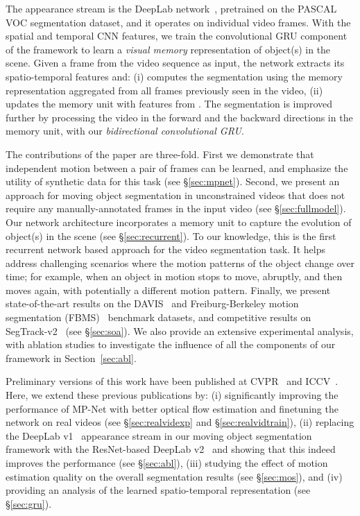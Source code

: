 The appearance stream is the DeepLab
network~\cite{chen2014semantic,CP2016Deeplab}, pretrained on the PASCAL VOC
segmentation dataset, and it operates on individual video frames.  With the
spatial and temporal CNN features, we train the convolutional GRU component of
the framework to learn a {\it visual memory} representation of object(s) in the
scene. Given a frame  from the video sequence as input, the network extracts
its spatio-temporal features and: (i) computes the segmentation using the
memory representation aggregated from all frames previously seen in the video,
(ii) updates the memory unit with features from . The segmentation is
improved further by processing the video in the forward and the backward
directions in the memory unit, with our {\it bidirectional convolutional GRU}.

The contributions of the paper are three-fold. First we demonstrate that
independent motion between a pair of frames can be learned, and emphasize the
utility of synthetic data for this task (see \S\ref{sec:mpnet}). Second, we present an approach for
moving object segmentation in unconstrained videos that does not require any
manually-annotated frames in the input video (see \S\ref{sec:fullmodel}).  Our
network architecture incorporates a memory unit to capture the evolution of
object(s) in the scene (see \S\ref{sec:recurrent}). To our knowledge, this is
the first recurrent network based approach for the video segmentation task. It
helps address challenging scenarios where the motion patterns of the object
change over time; for example, when an object in motion stops to move,
abruptly, and then moves again, with potentially a different motion pattern.
Finally, we present state-of-the-art results on the DAVIS~\cite{Perazzi16} and
Freiburg-Berkeley motion segmentation (FBMS)~\cite{ochs2014segmentation}
benchmark datasets, and competitive results on SegTrack-v2~\cite{li2013video}
(see \S\ref{sec:soa}). We also provide an extensive experimental analysis, with
ablation studies to investigate the influence of all the components of our
framework in Section~\ref{sec:abl}. 

Preliminary versions of this work have been published at
CVPR~\cite{tokmakov2016learning} and ICCV~\cite{tokmakov2017learning}. Here, we extend these previous publications by: (i) significantly improving
the performance of MP-Net with better optical flow estimation and finetuning
the network on real videos (see \S\ref{sec:realvidexp} and
\S\ref{sec:realvidtrain}), (ii) replacing the DeepLab
v1~\cite{chen2014semantic} appearance stream in our moving object segmentation
framework with the ResNet-based DeepLab v2~\cite{CP2016Deeplab} and showing
that this indeed improves the performance (see \S\ref{sec:abl}), (iii)
studying the effect of motion estimation quality on the overall segmentation
results (see \S\ref{sec:mos}), and (iv) providing an analysis of the learned
spatio-temporal representation (see \S\ref{sec:gru}).


